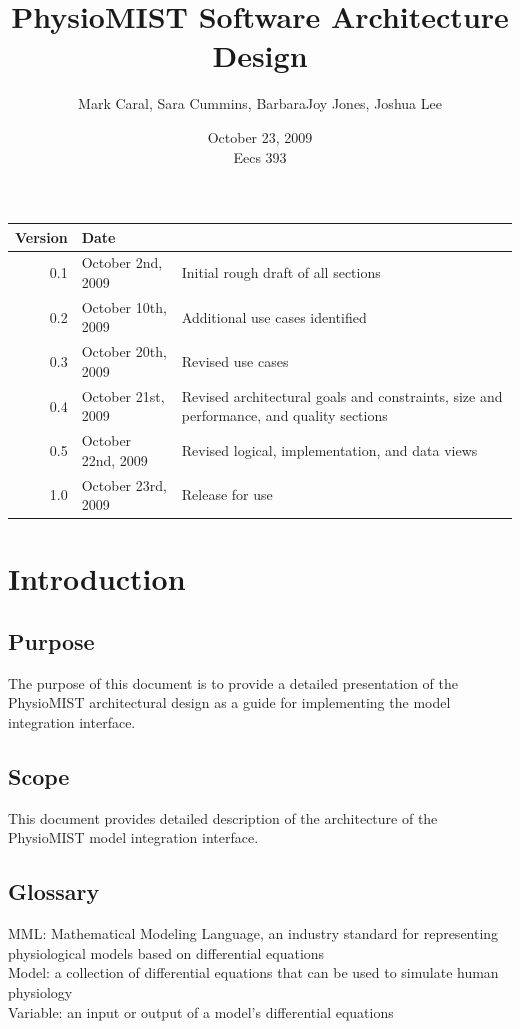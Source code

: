 \documentclass{article}
\title{PhysioMIST Software Architecture Design}
\author{Mark Caral, Sara Cummins, BarbaraJoy Jones, Joshua Lee}
\date{October 23, 2009\\{\sc Eecs} 393}
\begin{document}
\begin{titlepage}
\maketitle\thispagestyle{empty}
\end{titlepage}

\begin{tabular}{|r|l|p{9cm}|}
\hline Version & Date &  \\ 
\hline 0.1 & October 2nd, 2009 & Initial rough draft of all sections \\ 
\hline 0.2 & October 10th, 2009 & Additional use cases identified \\ 
\hline 0.3 & October 20th, 2009 & Revised use cases \\ 
\hline 0.4 & October 21st, 2009 & Revised architectural goals and constraints, size and performance, and quality sections \\ 
\hline 0.5 & October 22nd, 2009 & Revised logical, implementation, and data views\\ 
\hline 1.0 & October 23rd, 2009 & Release for use\\
\hline 
\end{tabular} 

\newpage

\tableofcontents
\newpage

\section{Introduction}
\subsection{Purpose}
The purpose of this document is to provide a detailed presentation of the PhysioMIST architectural design as a guide for implementing the model integration interface.
\subsection{Scope}
This document provides detailed description of the architecture of the PhysioMIST model integration interface.
\subsection{Glossary}
MML: Mathematical Modeling Language, an industry standard for representing physiological models based on differential equations\\
Model: a collection of differential equations that can be used to simulate human physiology\\
Variable: an input or output of a model's differential equations
\end{document}
